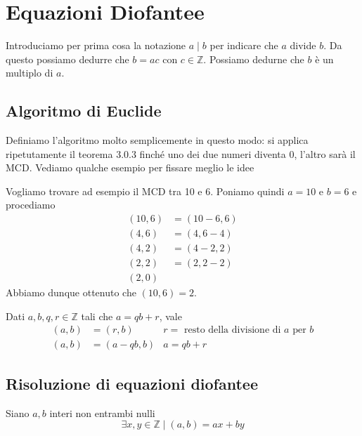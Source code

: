 \chapter{Equazioni Diofantee}
Introduciamo per prima cosa la notazione $a \mid b$ per indicare che $a$ divide $b$. Da questo
possiamo dedurre che $b = ac$ con $c \in \mathbb{Z}$. Possiamo dedurne che $b$ \`e un multiplo
di $a$.

\section{Algoritmo di Euclide}
Definiamo l'algoritmo molto semplicemente in questo modo: si applica ripetutamente
il teorema 3.0.3 finch\'e uno dei due numeri diventa $0$, l'altro sar\`a il MCD.
Vediamo qualche esempio per fissare meglio le idee
\begin{example}
	Vogliamo trovare ad esempio il MCD tra 10 e 6. Poniamo quindi $a = 10$ e $b = 6$ e
	procediamo
	\begin{equation*}
		\begin{array}{ll}
			(10, 6) & = (10 - 6, 6) \\
			(4, 6)  & = (4, 6 - 4)  \\
			(4, 2)  & = (4 - 2, 2)  \\
			(2, 2)  & = (2, 2 - 2)  \\
			(2, 0)
		\end{array}
	\end{equation*}
	Abbiamo dunque ottenuto che $(10, 6) = 2$.
\end{example}

\begin{theorem}
	Dati $a, b, q, r \in \mathbb{Z}$ tali che $a = qb + r$, vale
	\begin{equation*}
		\begin{array}{lll}
			(a, b) & = (r, b)      & \text{$r =$ resto della divisione di $a$ per $b$} \\
			(a, b) & = (a - qb, b) & \text{$a = qb + r$}
		\end{array}
	\end{equation*}
\end{theorem}

\section{Risoluzione di equazioni diofantee}
\begin{theorem}
	Siano $a, b$ interi non entrambi nulli
	\begin{equation*}
		\exists x, y \in \mathbb{Z} \mid (a, b) = ax + by
	\end{equation*}
\end{theorem}

